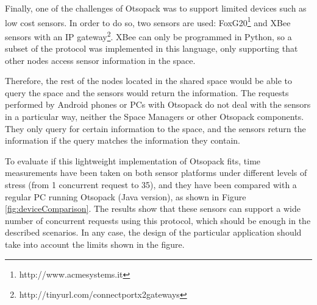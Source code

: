 Finally, one of the challenges of Otsopack was to support limited devices such as low cost sensors. In order to do so,
two sensors are used: FoxG20\footnote{http://www.acmesystems.it} and XBee sensors with an IP
gateway\footnote{http://tinyurl.com/connectportx2gateways}. XBee can only be programmed in Python, so a subset of the
protocol was implemented in this language, only supporting that other nodes access sensor information in the space. 

Therefore, the rest of the nodes located in the shared space would be able to query the space and the sensors would
return the information. The requests performed by Android phones or PCs with Otsopack do not deal with the sensors in a
particular way, neither the Space Managers or other Otsopack components. They only query for certain information to the
space, and the sensors return the information if the query matches the information they contain.

To evaluate if this lightweight implementation of Otsopack fits, time measurements have been taken on both sensor
platforms under different levels of stress (from 1 concurrent request to 35), and they have been compared with a regular
PC running Otsopack (Java version), as shown in Figure \ref{fig:deviceComparison}. The results show that these sensors
can support a wide number of concurrent requests using this protocol, which should be enough in the described
scenarios. In any case, the design of the particular application should take into account the limits shown in the
figure.









